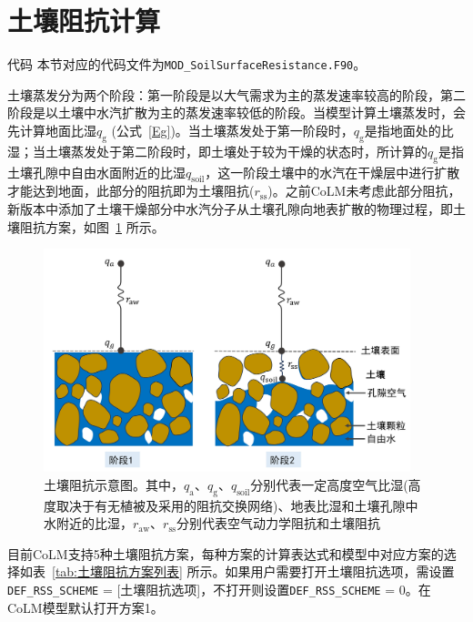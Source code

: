 \section{土壤阻抗计算}
\begin{mymdframed}{代码}
  本节对应的代码文件为\texttt{MOD\_SoilSurfaceResistance.F90}。
\end{mymdframed}

土壤蒸发分为两个阶段：第一阶段是以大气需求为主的蒸发速率较高的阶段，第二阶段是以土壤中水汽扩散为主的蒸发速率较低的阶段。当模型计算土壤蒸发时，会先计算地面比湿\(q_{\mathrm{g}}\) (公式~\eqref{Eg})。当土壤蒸发处于第一阶段时，\(q_{\mathrm{g}}\)是指地面处的比湿；当土壤蒸发处于第二阶段时，即土壤处于较为干燥的状态时，所计算的\(q_{\mathrm{g}}\)是指土壤孔隙中自由水面附近的比湿\(q_{\mathrm{soil}}\)，这一阶段土壤中的水汽在干燥层中进行扩散才能达到地面，此部分的阻抗即为土壤阻抗(\(r_{\mathrm{ss}}\))。之前CoLM未考虑此部分阻抗，新版本中添加了土壤干燥部分中水汽分子从土壤孔隙向地表扩散的物理过程，即土壤阻抗方案，如图~\ref{fig:土壤阻抗示意图} 所示。

{
  \begin{figure}[htbp]
    \centering
    \includegraphics[width=0.95\textwidth]{Figures/地表湍流交换过程/土壤阻抗示意图_v4.png}
    \caption[土壤阻抗示意图]{土壤阻抗示意图。其中，\(q_{\mathrm{a}}\)、\(q_{\mathrm{g}}\)、\(q_{\mathrm{soil}}\)分别代表一定高度空气比湿(高度取决于有无植被及采用的阻抗交换网络)、地表比湿和土壤孔隙中水附近的比湿，\(r_{\mathrm{aw}}\)、\(r_{\mathrm{ss}}\)分别代表空气动力学阻抗和土壤阻抗}
    \label{fig:土壤阻抗示意图}
  \end{figure}
}

目前CoLM支持5种土壤阻抗方案，每种方案的计算表达式和模型中对应方案的选择如表~\ref{tab:土壤阻抗方案列表} 所示。如果用户需要打开土壤阻抗选项，需设置\texttt{DEF\_RSS\_SCHEME}
= {[}土壤阻抗选项{]}，不打开则设置\texttt{DEF\_RSS\_SCHEME} =
0。在CoLM模型默认打开方案1。

